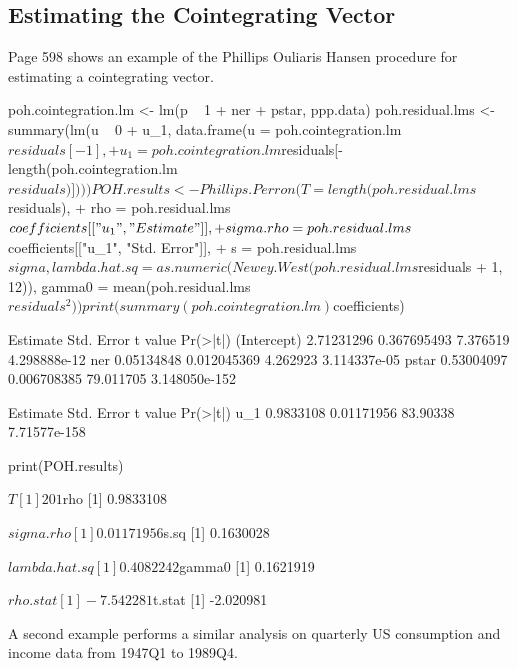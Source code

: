 \documentclass[a4paper]{article}
\renewcommand{\~}{\perispomeni}%
\begin{document}
\subsection{Estimating the Cointegrating Vector}
Page 598 shows an example of the Phillips Ouliaris Hansen procedure for estimating a cointegrating vector.
\begin{Schunk}
\begin{Sinput}
 poh.cointegration.lm <- lm(p ~ 1 + ner + pstar, ppp.data)
 poh.residual.lms <- summary(lm(u ~ 0 + u_1, data.frame(u = poh.cointegration.lm$residuals[-1], 
+     u_1 = poh.cointegration.lm$residuals[-length(poh.cointegration.lm$residuals)])))
 POH.results <- Phillips.Perron(T = length(poh.residual.lms$residuals), 
+     rho = poh.residual.lms$coefficients[["u_1", "Estimate"]], 
+     sigma.rho = poh.residual.lms$coefficients[["u_1", "Std. Error"]], 
+     s = poh.residual.lms$sigma, lambda.hat.sq = as.numeric(Newey.West(poh.residual.lms$residuals %
+         1, 12)), gamma0 = mean(poh.residual.lms$residuals^2))
 print(summary(poh.cointegration.lm)$coefficients)
\end{Sinput}
\begin{Soutput}
              Estimate  Std. Error   t value      Pr(>|t|)
(Intercept) 2.71231296 0.367695493  7.376519  4.298888e-12
ner         0.05134848 0.012045369  4.262923  3.114337e-05
pstar       0.53004097 0.006708385 79.011705 3.148050e-152
\end{Soutput}
\begin{Soutput}
     Estimate Std. Error  t value     Pr(>|t|)
u_1 0.9833108 0.01171956 83.90338 7.71577e-158
\end{Soutput}
\begin{Sinput}
 print(POH.results)
\end{Sinput}
\begin{Soutput}
$T
[1] 201

$rho
[1] 0.9833108

$sigma.rho
[1] 0.01171956

$s.sq
[1] 0.1630028

$lambda.hat.sq
[1] 0.4082242

$gamma0
[1] 0.1621919

$rho.stat
[1] -7.542281

$t.stat
[1] -2.020981
\end{Soutput}
\end{Schunk}
A second example performs a similar analysis on quarterly US consumption and income data from 1947Q1 to 1989Q4.
\end{document}
